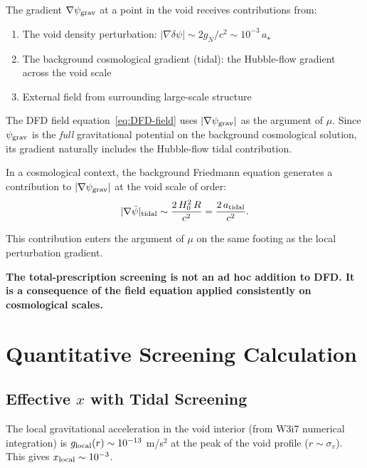 \documentclass[11pt,a4paper]{article}
\newcommand{\mufd}{\mu}
\newcommand{\psigrav}{\psi_{\rm grav}}
\newcounter{findingctr}
\newenvironment{finding}[1][]{%
  \refstepcounter{findingctr}%
  \begin{tcolorbox}[colback=blue!3!white, colframe=blue!50!black,
    title=\textbf{Finding \thefindingctr: #1}]
}{%
  \end{tcolorbox}%
}
\begin{document}
The gradient $\nabla\psigrav$ at a point in the void receives
contributions from:
\begin{enumerate}[nosep]
\item The void density perturbation: $|\nabla\delta\psi|
  \sim 2g_N/c^2 \sim 10^{-3}\,a_\star$
\item The background cosmological gradient (tidal): the
  Hubble-flow gradient across the void scale
\item External field from surrounding large-scale structure
\end{enumerate}

\begin{finding}[The DFD Field Equation Naturally Includes Tidal Terms]
\label{find:tidal}
The DFD field equation~\eqref{eq:DFD-field} uses $|\nabla\psigrav|$
as the argument of $\mufd$. Since $\psigrav$ is the \emph{full}
gravitational potential on the background cosmological solution, its
gradient naturally includes the Hubble-flow tidal contribution.

In a cosmological context, the background Friedmann equation generates
a contribution to $|\nabla\psigrav|$ at the void scale of order:
\begin{equation}
|\nabla\bar{\psi}|_{\rm tidal} \sim \frac{2\,H_0^2\,R}{c^2}
= \frac{2\,a_{\rm tidal}}{c^2}.
\end{equation}

This contribution enters the argument of $\mufd$ on the same
footing as the local perturbation gradient.

\textbf{The total-prescription screening is not an ad hoc addition
to DFD. It is a consequence of the field equation applied
consistently on cosmological scales.}
\end{finding}


\section{Quantitative Screening Calculation}
\label{sec:screening-quant}

\subsection{Effective $x$ with Tidal Screening}

The local gravitational acceleration in the void interior (from
W3i7 numerical integration) is $g_{\rm local}(r) \sim 10^{-13}$
m/s$^2$ at the peak of the void profile ($r \sim \sigma_v$). This
gives $x_{\rm local} \sim 10^{-3}$.
\end{document}
